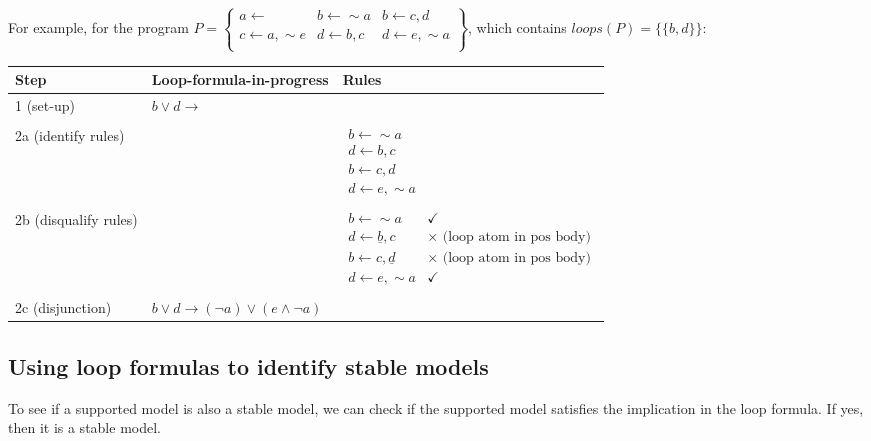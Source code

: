 \documentclass[9pt,a4paper,landscape]{article}
\begin{document}
{For example, for the program $P = \left\{\begin{array}{lll}
a \leftarrow & b \leftarrow {\sim} a & b \leftarrow c, d\\
c \leftarrow a, {\sim} e & d \leftarrow b, c & d \leftarrow e, {\sim} a\\
\end{array}\right\}$, which contains $loops(P) = \{ \{b, d\} \}$:

\begin{center}
	\begin{tabular}{p{3cm}p{5cm}p{6cm}}
		Step & Loop-formula-in-progress & Rules \\ \midrule
		1 (set-up) & $b \lor d \rightarrow$ & \\ & \\
		2a (identify rules) &  & $\begin{array}{l}
		b \leftarrow {\sim} a\\
		d \leftarrow b, c\\
		b \leftarrow c, d\\
		d \leftarrow e, {\sim} a
		\end{array}$  \\ & \\
		2b (disqualify rules) &  & $\begin{array}{ll}
		b \leftarrow {\sim} a & \checkmark \\
		d \leftarrow \underline{b}, c & \times  \text{ (loop atom in pos body)}\\
		b \leftarrow c, \underline{d} & \times  \text{ (loop atom in pos body)}\\
		d \leftarrow e, {\sim} a & \checkmark
		\end{array}$  \\ & \\
		2c (disjunction) & $b \lor d \rightarrow (\neg a) \lor (e \land \neg a)$
	\end{tabular}
\end{center}

\vspace{\baselineskip}


\subsection{Using loop formulas to identify stable models}

To see if a supported model is also a stable model, we can check if the supported model satisfies the implication in the loop formula.
If yes, then it is a stable model.

}
\end{document}
